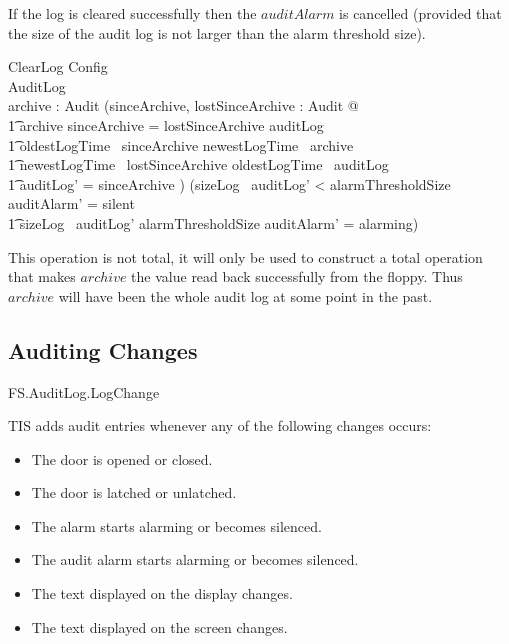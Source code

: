 If the log is cleared successfully then the $auditAlarm$ is cancelled
(provided that the size of the audit log is not larger than the alarm threshold size).

\begin{schema}{ClearLog}
        Config
\\      \Delta AuditLog
\\      archive : \finset Audit
\where
      (\exists sinceArchive,
        lostSinceArchive : \finset Audit @  
\\ \t1    archive \cup sinceArchive = lostSinceArchive \cup auditLog 
\\ \t1    \land oldestLogTime~ sinceArchive \geq newestLogTime~ archive
\\ \t1    \land newestLogTime~ lostSinceArchive \leq oldestLogTime~ auditLog
\\ \t1    \land auditLog' = sinceArchive )
\also
        (sizeLog~ auditLog' < alarmThresholdSize \land auditAlarm' = silent
\\ \t1  \lor sizeLog~ auditLog' \geq alarmThresholdSize \land auditAlarm' = alarming)

\end{schema}
\begin{Zcomment}
\item
This operation is not total, it will only be used to construct a total
operation that makes $archive$  the value read back successfully from
the floppy. Thus $archive$ will have been the whole audit log at some
point in the past.
\end{Zcomment}

\subsection{Auditing Changes}

\begin{traceunit}{FS.AuditLog.LogChange}
\end{traceunit}


TIS adds audit entries whenever any of the following changes occurs:
\begin{itemize}
\item
The door is opened or closed.
\item
The door is latched or unlatched.
\item
The alarm  starts alarming or becomes silenced.
\item
The audit alarm  starts alarming or becomes silenced.
\item
The text displayed on the display changes.
\item
The text displayed on the screen changes.
\end{itemize}

